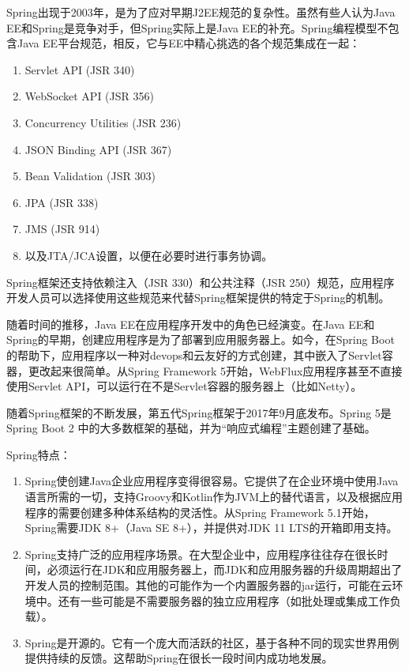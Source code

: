 Spring出现于2003年，是为了应对早期J2EE规范的复杂性。虽然有些人认为Java EE和Spring是竞争对手，但Spring实际上是Java EE的补充。Spring编程模型不包含Java EE平台规范，相反，它与EE中精心挑选的各个规范集成在一起：

\begin{enumerate}
  \item Servlet API (JSR 340)
  \item WebSocket API (JSR 356)
  \item Concurrency Utilities (JSR 236)
  \item JSON Binding API (JSR 367)
  \item Bean Validation (JSR 303)
  \item JPA (JSR 338)
  \item JMS (JSR 914)
  \item 以及JTA/JCA设置，以便在必要时进行事务协调。
\end{enumerate}

Spring框架还支持依赖注入（JSR 330）和公共注释（JSR 250）规范，应用程序开发人员可以选择使用这些规范来代替Spring框架提供的特定于Spring的机制。

随着时间的推移，Java EE在应用程序开发中的角色已经演变。在Java EE和Spring的早期，创建应用程序是为了部署到应用服务器上。如今，在Spring Boot的帮助下，应用程序以一种对devops和云友好的方式创建，其中嵌入了Servlet容器，更改起来很简单。从Spring Framework 5开始，WebFlux应用程序甚至不直接使用Servlet API，可以运行在不是Servlet容器的服务器上（比如Netty）。

随着Spring框架的不断发展，第五代Spring框架于2017年9月底发布。Spring 5是Spring Boot 2 中的大多数框架的基础，并为“响应式编程”主题创建了基础。

Spring特点：

\begin{enumerate}
  \item Spring使创建Java企业应用程序变得很容易。它提供了在企业环境中使用Java语言所需的一切，支持Groovy和Kotlin作为JVM上的替代语言，以及根据应用程序的需要创建多种体系结构的灵活性。从Spring Framework 5.1开始，Spring需要JDK 8+（Java SE 8+），并提供对JDK 11 LTS的开箱即用支持。
  \item Spring支持广泛的应用程序场景。在大型企业中，应用程序往往存在很长时间，必须运行在JDK和应用服务器上，而JDK和应用服务器的升级周期超出了开发人员的控制范围。其他的可能作为一个内置服务器的jar运行，可能在云环境中。还有一些可能是不需要服务器的独立应用程序（如批处理或集成工作负载）。
  \item Spring是开源的。它有一个庞大而活跃的社区，基于各种不同的现实世界用例提供持续的反馈。这帮助Spring在很长一段时间内成功地发展。
\end{enumerate}




